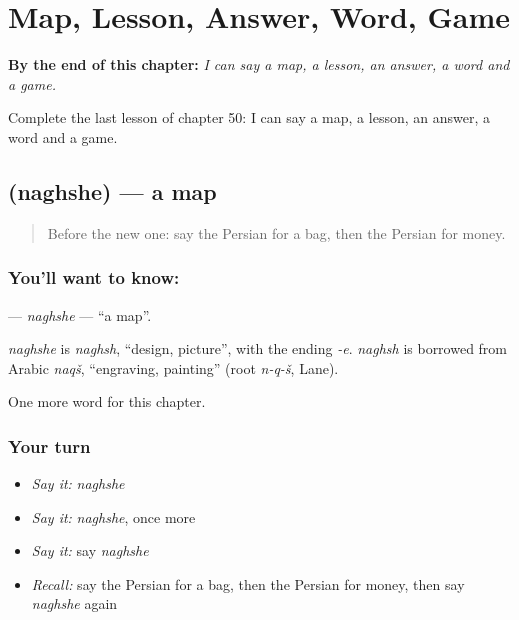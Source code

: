 
\chapter{Map, Lesson, Answer, Word, Game}
\label{ch:fa-map-lesson-answer-word-game}

\begin{chapteropening}
\textbf{By the end of this chapter:} \emph{I can say a map, a lesson, an answer, a word and a game.}

Complete the last lesson of chapter 50: I can say a map, a lesson, an answer, a word and a game.
\end{chapteropening}

\section[\texorpdfstring{\fa{نقشه} (naghshe)}{نقشه (naghshe)}]{ (naghshe) — a map}

\label{lesson:FA-C50-naghshe}



\begin{quote}
Before the new one: say the Persian for a bag, then the Persian for money.
\end{quote}

\subsection*{You'll want to know: }
\textbf{} — \emph{naghshe} — \textquotedblleft{}a map\textquotedblright{}.

\begin{cousinweb}
\emph{naghshe} is \emph{naghsh}, \textquotedblleft{}design, picture\textquotedblright{}, with the ending \emph{-e}. \emph{naghsh} is borrowed from Arabic \emph{naqš}, \textquotedblleft{}engraving, painting\textquotedblright{} (root \emph{n-q-š}, Lane).
\end{cousinweb}

\begin{grammarlens}[title={What you've built}]
One more word for this chapter.
\end{grammarlens}

\subsection*{Your turn}
\begin{itemize}
\raggedright
  \item \emph{Say it:} \emph{naghshe}
  \item \emph{Say it:} \emph{naghshe}, once more
  \item \emph{Say it:} say \emph{naghshe}
  \item \emph{Recall:} say the Persian for a bag, then the Persian for money, then say \emph{naghshe} again
\end{itemize}

